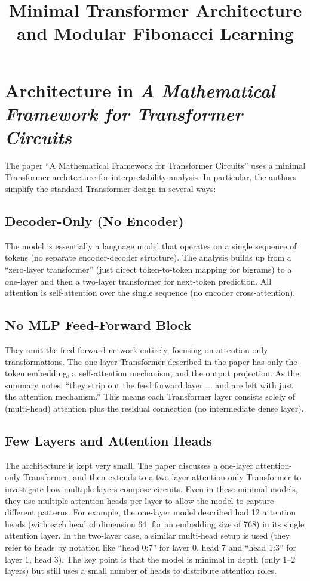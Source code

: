 \documentclass{article}
\title{Minimal Transformer Architecture and Modular Fibonacci Learning}
\author{}
\date{}
\begin{document}
\maketitle

\section*{Architecture in \textit{A Mathematical Framework for Transformer Circuits}}

The paper ``A Mathematical Framework for Transformer Circuits'' uses a minimal Transformer architecture for interpretability analysis. In particular, the authors simplify the standard Transformer design in several ways:

\subsection*{Decoder-Only (No Encoder)}
The model is essentially a language model that operates on a single sequence of tokens (no separate encoder-decoder structure). The analysis builds up from a ``zero-layer transformer'' (just direct token-to-token mapping for bigrams) to a one-layer and then a two-layer transformer for next-token prediction. All attention is self-attention over the single sequence (no encoder cross-attention).

\subsection*{No MLP Feed-Forward Block}
They omit the feed-forward network entirely, focusing on attention-only transformations. The one-layer Transformer described in the paper has only the token embedding, a self-attention mechanism, and the output projection. As the summary notes: ``they strip out the feed forward layer ... and are left with just the attention mechanism.'' This means each Transformer layer consists solely of (multi-head) attention plus the residual connection (no intermediate dense layer).

\subsection*{Few Layers and Attention Heads}
The architecture is kept very small. The paper discusses a one-layer attention-only Transformer, and then extends to a two-layer attention-only Transformer to investigate how multiple layers compose circuits. Even in these minimal models, they use multiple attention heads per layer to allow the model to capture different patterns. For example, the one-layer model described had 12 attention heads (with each head of dimension 64, for an embedding size of 768) in its single attention layer. In the two-layer case, a similar multi-head setup is used (they refer to heads by notation like ``head 0:7'' for layer 0, head 7 and ``head 1:3'' for layer 1, head 3). The key point is that the model is minimal in depth (only 1--2 layers) but still uses a small number of heads to distribute attention roles.
\end{document}
